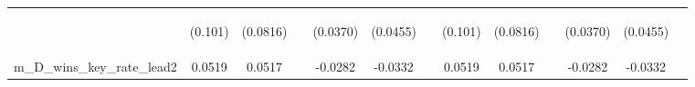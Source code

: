 \documentclass[]{article}
\begin{document}
\begin{center}
\begin{tabular}{lcccccccccccc}
\vspace{4pt} & \begin{footnotesize}(0.101)\end{footnotesize} & \begin{footnotesize}(0.0816)\end{footnotesize} & \begin{footnotesize}\end{footnotesize} & \begin{footnotesize}(0.0370)\end{footnotesize} & \begin{footnotesize}(0.0455)\end{footnotesize} & \begin{footnotesize}\end{footnotesize} & \begin{footnotesize}(0.101)\end{footnotesize} & \begin{footnotesize}(0.0816)\end{footnotesize} & \begin{footnotesize}\end{footnotesize} & \begin{footnotesize}(0.0370)\end{footnotesize} & \begin{footnotesize}(0.0455)\end{footnotesize} & \begin{footnotesize}\end{footnotesize} \\
m\_D\_wins\_key\_rate\_lead2 & 0.0519 & 0.0517 &  & -0.0282 & -0.0332 &  & 0.0519 & 0.0517 &  & -0.0282 & -0.0332 &  \\

\end{tabular}
\end{center}
\end{document}
